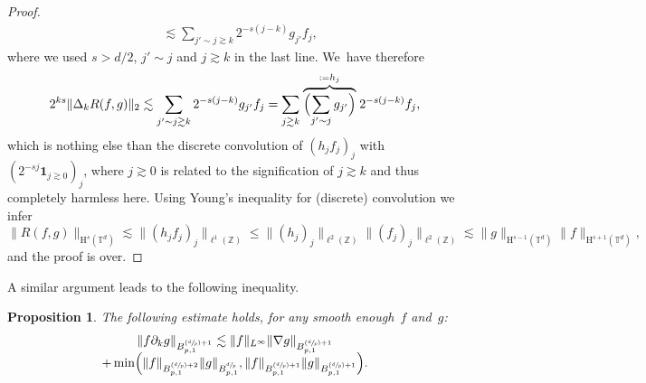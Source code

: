 \documentclass[10pt]{amsart}
\newcommand{\Psfrac}[2]{(\sfrac{#1}{#2})}
\newtheorem{prop}{Proposition}[section]
\theoremstyle{definition}
\newcommand\Z{\mathbb{Z}}
\newcommand\T{\mathbb{T}}
\renewcommand\H{\mathrm{H}}
\begin{document}
\begin{proof}
\begin{align*}
&\lesssim \sum_{j'\sim j \gtrsim k} 2^{-s(j-k)} g_{j'} f_j,
\end{align*}
where we used $s>d/2$, $j'\sim j$ and $j\gtrsim k$ in the last line. We~have therefore
\[
2^{ks}\|\Delta_k R(f,g)\|_2 \lesssim \sum_{j'\sim j \gtrsim k} 2^{-s(j-k)} g_{j'} f_j = \sum_{j\gtrsim k} \stackrel{:=h_j}{\overbrace{\Bigl(\sum_{j'\sim j} g_{j'}\Bigr)}}2^{-s(j-k)}f_j,
\]
which is nothing else than the discrete convolution of $(h_j f_j)_j$ with $(2^{-sj}\mathbf{1}_{j\gtrsim 0})_j$, where $j\gtrsim 0$ is related to the signification of $j\gtrsim k$ and thus completely harmless here. Using Young's inequality for (discrete) convolution we infer
\[
\|R(f,g)\|_{\H^s(\T^d)}\lesssim \|(h_j f_j)_j\|_{\ell^1(\Z)} \leq \|(h_j)_j\|_{\ell^2(\Z)}\|(f_j)_j\|_{\ell^2(\Z)} \lesssim \|g\|_{\H^{s-1}(\T^d)}\|f\|_{\H^{s+1}(\T^d)},
\]
and the proof is over.
\end{proof}
A similar argument leads to the following inequality.
\begin{prop}\label{prop:rhsBesov}
The following estimate holds, for any smooth enough~$f$ and~$g$:
\begin{multline*}
\|f \partial_k g\|_{ B^{\Psfrac dp+1}_{p,1}} \lesssim \|f\|_{L^\infty } \|\nabla g\|_{ B^{\Psfrac dp+1}_{p,1}}\\[-5pt]
+\min \Bigl(
\| f\|_{B^{\Psfrac dp+2}_{p,1}} \|g\|_{B^{\sfrac dp}_{p,1}}, \| f\|_{B^{\Psfrac dp+1}_{p,1}} \|g\|_{B^{\Psfrac dp+1}_{p,1}} \Bigr).
\end{multline*}
\end{prop}
\end{document}
